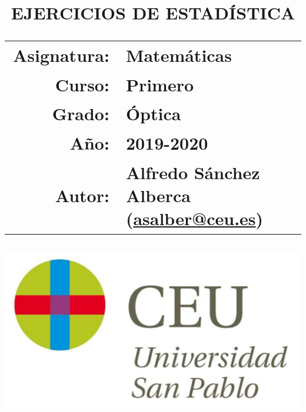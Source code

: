 \documentclass[a4paper,titlepage]{article}
\begin{document}
  \sloppy
  
  
\title{\vskip 2cm
\Huge \textbf{\textsf{\quad \textcolor{blueceu}{EJERCICIOS DE ESTADÍSTICA}\quad}}\\
   \vskip 1cm
\Large \sffamily
\begin{tabular}{rl}
\textcolor{blueceu}{Asignatura:} & Matemáticas\\
\textcolor{blueceu}{Curso:} & Primero\\
\textcolor{blueceu}{Grado:} & Óptica\\
\textcolor{blueceu}{Año:} & 2019-2020\\
\textcolor{blueceu}{Autor:} %
& Alfredo S\'anchez Alberca (\url{asalber@ceu.es})
\end{tabular}
}
  
  \author{}
  \date{\includegraphics[scale=0.3]{img/logo_uspceu}}
  
  \maketitle
  \newpage
  \tableofcontents
  \newpage
  
  
  
  
  
  
  
  
\end{document}
